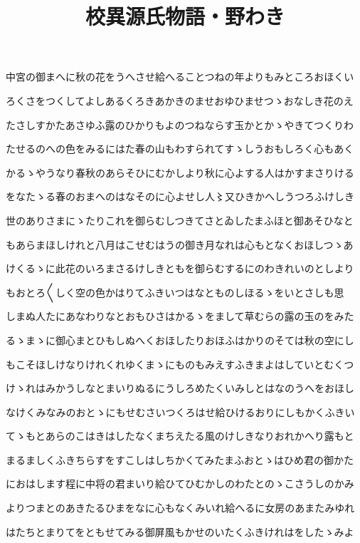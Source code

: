 \documentclass[a4paper,11pt,landscape]{ltjtarticle}
\title{校異源氏物語・野わき}
\date{}
\begin{document}
\maketitle

中宮の御まへに秋の花をうへさせ給へることつねの年よりもみところおほくい
\par\medskip
ろくさをつくしてよしあるくろきあかきのませおゆひませつゝおなしき花のえ
\par\medskip
たさしすかたあさゆふ露のひかりもよのつねならす玉かとかゝやきてつくりわ
\par\medskip
たせるのへの色をみるにはた春の山もわすられてすゝしうおもしろく心もあく
\par\medskip
かるゝやうなり春秋のあらそひにむかしより秋に心よする人はかすまさりける
\par\medskip
をなたゝる春のおまへのはなそのに心よせし人〻又ひきかへしうつろふけしき
\par\medskip
世のありさまにゝたりこれを御らむしつきてさとゐしたまふほと御あそひなと
\par\medskip
もあらまほしけれと八月はこせむはうの御き月なれは心もとなくおほしつゝあ
\par\medskip
けくるゝに此花のいろまさるけしきともを御らむするにのわきれいのとしより
\par\medskip
もおとろ〱しく空の色かはりてふきいつはなとものしほるゝをいとさしも思
\par\medskip
しまぬ人たにあなわりなとおもひさはかるゝをまして草むらの露の玉のをみた
\par\medskip
るゝまゝに御心まとひもしぬへくおほしたりおほふはかりのそては秋の空にし
\par\medskip
もこそほしけなりけれくれゆくまゝにものもみえすふきまよはしていとむくつ
\par\medskip
けゝれはみかうしなとまいりぬるにうしろめたくいみしとはなのうへをおほし
\par\medskip
なけくみなみのおとゝにもせむさいつくろはせ給ひけるおりにしもかくふきい
\par\medskip
てゝもとあらのこはきはしたなくまちえたる風のけしきなりおれかへり露もと
\par\medskip
まるましくふきちらすをすこしはしちかくてみたまふおとゝはひめ君の御かた
\par\medskip
におはします程に中将の君まいり給ひてひむかしのわたとのゝこさうしのかみ
\par\medskip
よりつまとのあきたるひまをなに心もなくみいれ給へるに女房のあまたみゆれ
\par\medskip
はたちとまりてをともせてみる御屏風もかせのいたくふきけれはをしたゝみよ
\end{document}
